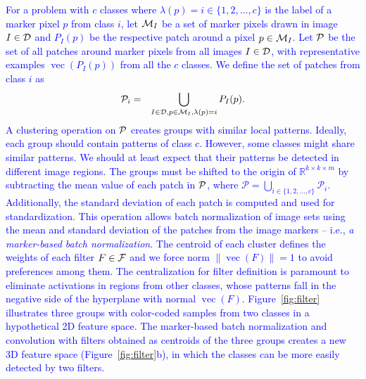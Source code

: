 \documentclass[a4paper,conference]{IEEEtran}
\DeclareMathOperator{\vect}{vec}
\newcommand{\R}{\mathbb{R}}
\begin{document}
\textcolor{blue}{For a problem with $c$ classes where $\lambda(p)=i\in \{1,2,\ldots,c\}$ is the label of a marker pixel $p$ from class $i$, let ${\cal M}_I$ be a set of marker pixels drawn in image $I\in {\cal D}$ and $P_I(p)$ be the respective patch around a pixel $p\in {\cal M}_I$. Let ${\cal P}$ be the set of all patches around marker pixels from all images $I\in {\cal D}$, with representative examples  $\vect(P_I(p))$ from all the $c$ classes. We define the set of patches from class $i$ as
\begin{eqnarray}
{\cal P}_i & = & \bigcup_{I\in {\cal D},p\in {\cal M}_I, \lambda(p) = i}{P_I(p)}.
\label{eq:pset}
\end{eqnarray}
A clustering operation on ${\cal P}$ creates groups with similar local patterns. Ideally, each group should contain patterns of class $c$. However, some classes might share similar patterns. We should at least expect that their patterns be detected in different image regions. The groups must be shifted to the origin of $\R^{k\times k\times m}$ by subtracting the mean value of each patch in ${\cal P}$, where $\mathcal{P} = \bigcup_{i \in \{1, 2, \ldots, c\}}{\mathcal{P}_i}$. Additionally, the standard deviation of each patch is computed and used for standardization. This operation allows batch normalization of image sets using the mean and standard deviation of the patches from the image markers -- i.e.,  \emph{a marker-based batch normalization}. The centroid of each cluster defines the weights of each filter $F\in {\cal F}$ and we force norm $\|\vect(F)\|=1$ to avoid preferences among them. The centralization for filter definition is paramount to eliminate activations in regions from other classes, whose patterns fall in the negative side of the hyperplane with normal $\vect(F)$. Figure~\ref{fig:filter} illustrates three groups with color-coded samples from two classes in a hypothetical 2D feature space. The marker-based batch normalization and convolution with filters obtained as centroids of the three groups creates a new 3D feature space (Figure~\ref{fig:filter}b), in which the classes can be more easily detected by two filters.}
\end{document}

